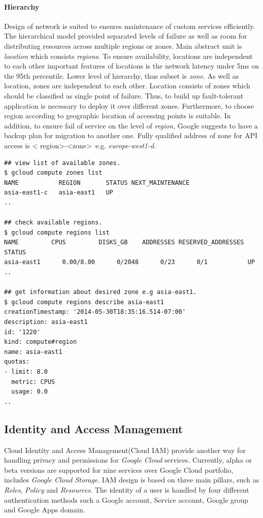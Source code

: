 \documentclass[a4paper,12pt,oneside]{report}
\begin{document}
\paragraph*{Hierarchy}
Design of network is suited to ensures maintenance  of custom services efficiently. The hierarchical model provided separated
 levels of failure as well as room for distributing resources across multiple regions or zones. Main abstract unit is \textit{location} 
 which consists \textit{regions}. To ensure availability, locations are independent to each other important features of locations is the 
 network latency under 5ms on the 95th percentile. Lower level of hierarchy, thus subset is \textit{zone}. As well as location, 
 zones are independent to each other. Location consists of zones which should be classified as single point of failure. Thus, 
 to build up fault-tolerant application is necessary to deploy it over different zones. Furthermore, to choose region according 
 to geographic location of accessing points is suitable. In addition, to ensure fail of service on the level of \textit{region}, 
 Google suggests to have a backup plan for migration to another one. Fully qualified address of zone   for API access is \textless 
 region\textgreater-\textless zone\textgreater \ e.g. \textit{europe-west1-d}. 


\begin{footnotesize}\begin{lstlisting}[style=mybash]
## view list of available zones.
$ gcloud compute zones list
NAME           REGION       STATUS NEXT_MAINTENANCE 
asia-east1-c   asia-east1   UP
..

## check available regions.
$ gcloud compute regions list
NAME         CPUS         DISKS_GB    ADDRESSES RESERVED_ADDRESSES STATUS 
asia-east1      0.00/8.00      0/2048      0/23      0/1           UP
..

## get information about desired zone e.g asia-east1.
$ gcloud compute regions describe asia-east1
creationTimestamp: '2014-05-30T18:35:16.514-07:00'
description: asia-east1
id: '1220'
kind: compute#region
name: asia-east1
quotas:
- limit: 8.0
  metric: CPUS
  usage: 0.0
..
\end{lstlisting}\end{footnotesize}
 
        



\subsection{Identity and Access Management}
Cloud Identity and Access Management(Cloud IAM) provide another way for handling privacy 
and permissions for \textit{Google Cloud} services. Currently, alpha  or beta versions are 
supported for nine services over Google Cloud portfolio, 
includes \textit{Google Cloud Storage}. IAM design is based on three main pillars, 
such as \textit{Roles}, \textit{Policy} and \textit{Resources}. The 
identity of a user is handled by four different authentication methods such a Google 
account, Service account, Google group and Google Apps domain.
\end{document}
